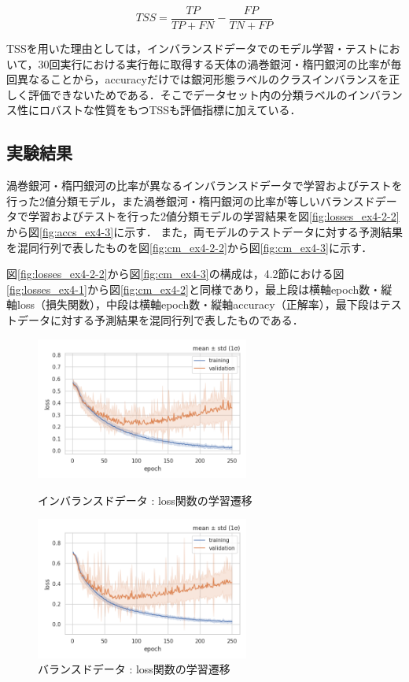 \documentclass[a4j, 11pt]{jreport}
\begin{document}
\begin{equation}
	TSS = \frac{TP}{TP + FN} - \frac{FP}{TN + FP}
 \label{equ:tss}
\end{equation}

TSSを用いた理由としては，インバランスドデータでのモデル学習・テストにおいて，30回実行における実行毎に取得する天体の渦巻銀河・楕円銀河の比率が毎回異なることから，accuracyだけでは銀河形態ラベルのクラスインバランスを正しく評価できないためである．そこでデータセット内の分類ラベルのインバランス性にロバストな性質をもつTSSも評価指標に加えている．

\subsection{実験結果}
渦巻銀河・楕円銀河の比率が異なるインバランスドデータで学習およびテストを行った2値分類モデル，また渦巻銀河・楕円銀河の比率が等しいバランスドデータで学習およびテストを行った2値分類モデルの学習結果を図\ref{fig:losses_ex4-2-2}から図\ref{fig:accs_ex4-3}に示す．
また，両モデルのテストデータに対する予測結果を混同行列で表したものを図\ref{fig:cm_ex4-2-2}から図\ref{fig:cm_ex4-3}に示す．

図\ref{fig:losses_ex4-2-2}から図\ref{fig:cm_ex4-3}の構成は，4.2節における図\ref{fig:losses_ex4-1}から図\ref{fig:cm_ex4-2}と同様であり，最上段は横軸epoch数・縦軸loss（損失関数），中段は横軸epoch数・縦軸accuracy（正解率），最下段はテストデータに対する予測結果を混同行列で表したものである．


\begin{figure}[htbp]
  \begin{minipage}[b]{0.45\hsize}
    \centering
    \includegraphics[keepaspectratio, width=7cm]{images/losses_ex4-2.png}
    \caption{インバランスドデータ : loss関数の学習遷移}
		\label{fig:losses_ex4-2-2}
  \end{minipage}
  \begin{minipage}[b]{0.45\hsize}
    \centering
    \includegraphics[keepaspectratio, width=7cm]{images/losses_ex4-3.png}
    \caption{バランスドデータ : loss関数の学習遷移}
		\label{fig:losses_ex4-3}
  \end{minipage}
\end{figure}
\end{document}
